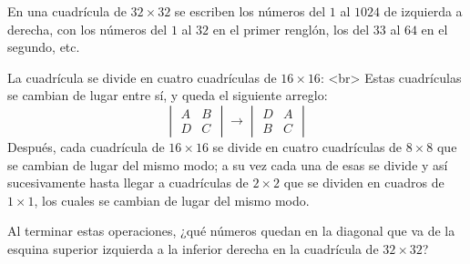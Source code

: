 En una cuadrícula de $32\times 32$ se escriben los números del $1$ al $1024$ de izquierda a derecha, con los números del $1$ al $32$ en el primer renglón, los del $33$ al $64$ en el segundo, etc. 

La cuadrícula se divide en cuatro cuadrículas de $16\times 16$:
<br>
Estas cuadrículas se cambian de lugar entre sí, y queda el siguiente arreglo:
\[\begin{vmatrix}A&B\\D&C\end{vmatrix}\to\begin{vmatrix}D&A\\B&C\end{vmatrix}\]
Después, cada cuadrícula de $16\times 16$ se divide en cuatro cuadrículas de $8\times 8$ que se cambian de lugar del mismo modo; a su vez cada una de esas se divide y así sucesivamente hasta llegar a cuadrículas de $2\times 2$ que se dividen en cuadros de $1\times 1$, los cuales se cambian de lugar del mismo modo.

Al terminar estas operaciones, ¿qué números quedan en la diagonal que va de la esquina superior izquierda a la inferior derecha en la cuadrícula de $32\times 32$?